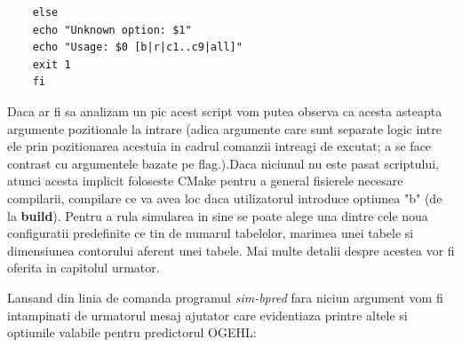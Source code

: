 \begin{verbatim}
	else
	echo "Unknown option: $1"
	echo "Usage: $0 [b|r|c1..c9|all]"
	exit 1
	fi

\end{verbatim}

Daca ar fi sa analizam un pic acest script vom putea observa ca acesta asteapta argumente pozitionale la intrare (adica argumente care sunt separate logic intre ele prin pozitionarea acestuia in cadrul comanzii intreagi de excutat; a se face contrast cu argumentele bazate pe flag.).Daca niciunul nu este pasat scriptului, atunci acesta implicit foloseste CMake pentru a general fisierele necesare compilarii, compilare ce va avea loc daca utilizatorul introduce optiunea "b" (de la \textbf{build}). Pentru a rula simularea in sine se poate alege una dintre cele noua configuratii predefinite ce tin de numarul tabelelor, marimea unei tabele si dimensiunea contorului aferent unei tabele. Mai multe detalii despre acestea vor fi oferita in capitolul urmator.

Lansand din linia de comanda programul \textit{sim-bpred} fara niciun argument vom fi intampinati de urmatorul mesaj ajutator care evidentiaza printre altele si optiunile valabile pentru predictorul OGEHL:

